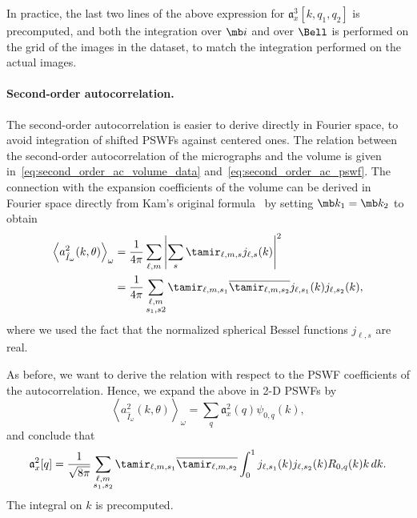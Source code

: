 \documentclass[9pt,twocolumn,twoside,lineno]{pnas-new}
\begin{document}
In practice, the last two lines of the above expression for $\mathfrak{a}_x^3[k,q_1,q_2]$ is precomputed, and both the integration over $\mb i$ and over $\Bell$ is performed on the grid of the images in the dataset, to match the integration performed on the actual images.

\paragraph{Second-order autocorrelation.}
The second-order autocorrelation is easier to derive directly in Fourier space, to avoid integration of shifted PSWFs against centered ones. 
The relation between the second-order autocorrelation of the micrographs and the volume is given in~\eqref{eq:second_order_ac_volume_data} and~\eqref{eq:second_order_ac_pswf}. 
The connection with the expansion coefficients of the volume can be derived in  Fourier space directly from Kam's
original formula~\cite{kam1980reconstruction} by setting $\mb k_1 = \mb k_2$ to
obtain
\begin{align*}
\left\langle a^2_{\hat{I}_{\omega}}(k,\theta)\right\rangle_{\omega} &=
\frac{1}{4\pi}\sum_{\ell,
	m}\left|\sum_s\tamir_{\ell,m,s}j_{\ell,s}(k)\right|^2 \\&=
\frac{1}{4\pi}\sum_{\substack{\ell,m\\s_1,s2}}\tamir_{\ell,m,s_1}\overline{\tamir_{\ell,m,s_2}}j_{\ell,s_1}(k)j_{\ell,s_2}(k),
\end{align*}
where we used the fact that the normalized spherical Bessel functions
$j_{\ell,s}$ are real. 

As before, we want to derive the relation with respect to the PSWF coefficients of the autocorrelation. Hence,  we expand the above in 2-D PSWFs by
\[\left\langle a^2_{\hat{I}_{\omega}}(k,\theta)\right\rangle_{\omega} =
\sum_{q}\mathfrak{a}_x^2(q)\psi_{0,q}(k),\]
and conclude that 
\begin{equation} \label{eq:ac_2_prolates}
\mathfrak{a}_x^2[q] =
\frac{1}{\sqrt{8\pi}}\sum_{\substack{\ell,m\\s_1,s_2}}\tamir_{\ell,m,s_1}\overline{\tamir_{\ell,m,s_2}}
\int_0^1j_{\ell,s_1}(k)j_{\ell,s_2}(k)R_{0,q}(k)k\, dk.
\end{equation}
The integral on $k$ is precomputed. 
\end{document}

